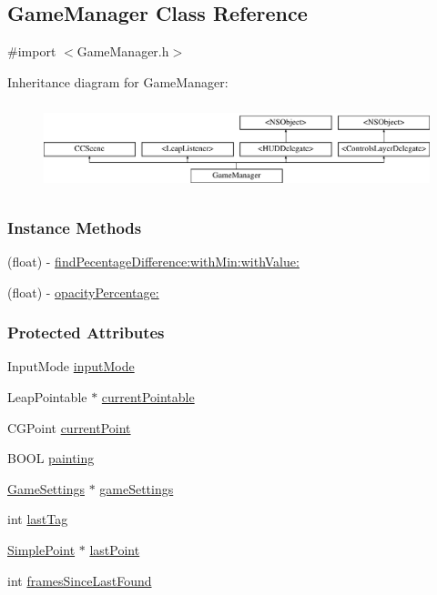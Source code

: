\hypertarget{interface_game_manager}{\subsection{Game\-Manager Class Reference}
\label{d4/d94/interface_game_manager}
}


{\ttfamily \#import $<$Game\-Manager.\-h$>$}

Inheritance diagram for Game\-Manager\-:\begin{figure}[H]
\begin{center}
\leavevmode
\includegraphics[height=2.560976cm]{d4/d94/interface_game_manager}
\end{center}
\end{figure}
\subsubsection*{Instance Methods}
\begin{DoxyCompactItemize}
\item 
(float) -\/ \hyperlink{interface_game_manager_a7071b8391346173da0beeac17ea27310}{find\-Pecentage\-Difference\-:with\-Min\-:with\-Value\-:}
\item 
(float) -\/ \hyperlink{interface_game_manager_a0acb835edfa002c4c66a92d02376bd0b}{opacity\-Percentage\-:}
\end{DoxyCompactItemize}
\subsubsection*{Protected Attributes}
\begin{DoxyCompactItemize}
\item 
Input\-Mode \hyperlink{interface_game_manager_a43f8cf09eea5b0766c73b0d2b258644c}{input\-Mode}
\item 
Leap\-Pointable $\ast$ \hyperlink{interface_game_manager_a9899e94be0e9364a59e5b76d5025d9f7}{current\-Pointable}
\item 
C\-G\-Point \hyperlink{interface_game_manager_a880d3cc994cc208b57a97fac088c2781}{current\-Point}
\item 
B\-O\-O\-L \hyperlink{interface_game_manager_a71f6112c6ebea5c0083db68cdb0e01d8}{painting}
\item 
\hyperlink{interface_game_settings}{Game\-Settings} $\ast$ \hyperlink{interface_game_manager_a97ff3b8cd0cbc6baf6f5abe3bb3417ca}{game\-Settings}
\item 
int \hyperlink{interface_game_manager_a0b83b09829718f85c17d64f6ee06d441}{last\-Tag}
\item 
\hyperlink{interface_simple_point}{Simple\-Point} $\ast$ \hyperlink{interface_game_manager_a4f2a6986ffdbc41d661e90deaee4551a}{last\-Point}
\item 
int \hyperlink{interface_game_manager_a546c4660d830a79c27bc2a51da00df12}{frames\-Since\-Last\-Found}
\end{DoxyCompactItemize}
